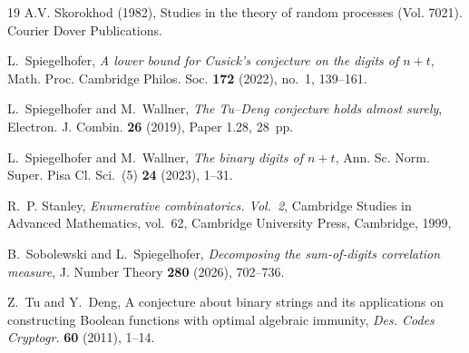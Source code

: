 \documentclass[10pt]{amsart}
\theoremstyle{definition}
\numberwithin{equation}{section}
\begin{document}
\begin{thebibliography}{19}
 A.V. Skorokhod (1982), Studies in the theory of random processes (Vol. 7021). Courier Dover Publications.

L.~Spiegelhofer,
\emph{A lower bound for {C}usick's conjecture on the digits of $n + t$},
Math. Proc. Cambridge Philos. Soc. \textbf{172} (2022), no.~1, 139--161.

L.~Spiegelhofer and M.~Wallner,
\emph{The {T}u--{D}eng conjecture holds almost surely},
Electron. J. Combin. \textbf{26} (2019), Paper 1.28, 28~pp.


L.~Spiegelhofer and M.~Wallner,
\emph{The binary digits of $n + t$},
Ann. Sc. Norm. Super. Pisa Cl. Sci.~(5) \textbf{24} (2023), 1--31.

R.~P. Stanley,
\emph{Enumerative combinatorics. {V}ol.~2},
Cambridge Studies in Advanced Mathematics, vol.~62,
Cambridge University Press, Cambridge, 1999,



B.~Sobolewski and L.~Spiegelhofer,
\emph{Decomposing the sum-of-digits correlation measure},
J. Number Theory \textbf{280} (2026), 702--736.

Z.~Tu and Y.~Deng,
A conjecture about binary strings and its applications on constructing Boolean functions with optimal algebraic immunity,
\emph{Des. Codes Cryptogr.} \textbf{60} (2011), 1--14.

\end{thebibliography}
\end{document}
